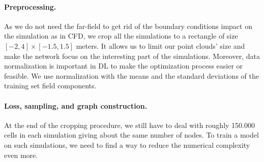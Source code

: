 \paragraph{Preprocessing.} As we do not need the far-field to get rid of the boundary conditions impact on the simulation as in CFD, we crop all the simulations to a rectangle of size $[-2, 4]\times[-1.5, 1.5]$ meters. It allows us to limit our point clouds' size and make the network focus on the interesting part of the simulations. Moreover, data normalization is important in DL to make the optimization process easier or feasible. We use normalization with the means and the standard deviations of the training set field components.

\paragraph{Loss, sampling, and graph construction.} At the end of the cropping procedure, we still have to deal with roughly \SI{150,000}{} cells in each simulation giving about the same number of nodes. To train a model on such simulations, we need to find a way to reduce the numerical complexity even more. 

